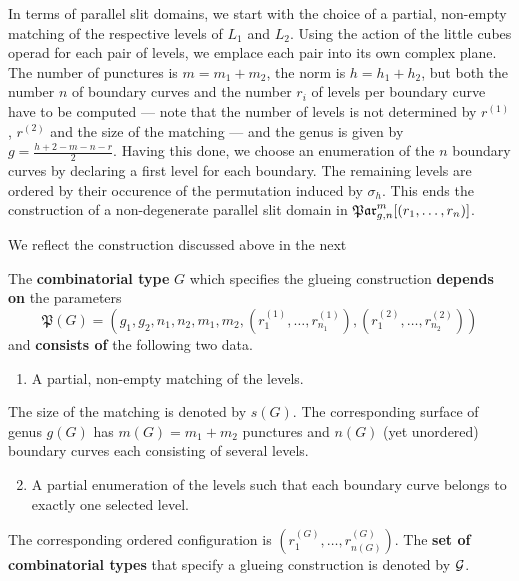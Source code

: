 In terms of parallel slit domains, we start with the choice of a partial, non-empty matching of the respective levels of $L_1$ and $L_2$.
Using the action of the little cubes operad for each pair of levels, we emplace each pair into its own complex plane.
The number of punctures is $m = m_1 + m_2$, the norm is $h = h_1 + h_2$, but both the number $n$ of boundary curves and the number $r_i$ of levels per boundary curve have to be computed
--- note that the number of levels is not determined by $r^{(1)}$, $r^{(2)}$ and the size of the matching ---
and the genus is given by $g = \frac{h+2-m-n-r}{2}$.
Having this done, we choose an enumeration of the $n$ boundary curves by declaring a first level for each boundary.
The remaining levels are ordered by their occurence of the permutation induced by $\sigma_{h}$.
This ends the construction of a non-degenerate parallel slit domain in $\Par_{g,n}^m[(r_1, \ldots, r_n)]$.

We reflect the construction discussed above in the next
\begin{defi}
    The {\bf combinatorial type} $G$ which specifies the glueing construction {\bf depends on} the parameters
    \[
        \mathfrak P(G) = (g_1, g_2, n_1, n_2, m_1, m_2, (r_1^{(1)}, \ldots, r_{n_1}^{(1)}), (r_1^{(2)}, \ldots, r_{n_2}^{(2)}))
    \]
    and {\bf consists of} the following two data.
    \begin{enumerate}
        \item A partial, non-empty matching of the levels.
    \end{enumerate}
    The size of the matching is denoted by $s(G)$.
    The corresponding surface of genus $g(G)$ has $m(G) = m_1 + m_2$ punctures and $n(G)$ (yet unordered) boundary curves each consisting of several levels.
    \begin{enumerate}
        \setcounter{enumi}{1}
        \item A partial enumeration of the levels such that each boundary curve belongs to exactly one selected level.
    \end{enumerate}
    The corresponding ordered configuration is $(r^{(G)}_1, \ldots, r^{(G)}_{n(G)})$.
    The {\bf set of combinatorial types} that specify a glueing construction is denoted by $\mathcal{G}$.
\end{defi}


